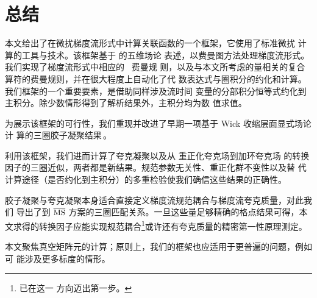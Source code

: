 \section{总结}\label{sec:conclusions}

本文给出了在微扰梯度流形式中计算关联函数的一个框架，它使用了标准微扰
 计算的工具与技术。该框架基于  的五维场论
表述，以费曼图方法处理梯度流形式。我们实现了梯度流形式中相应的 \qcd\ 费曼规
则，以及与本文所考虑的量相关的复合算符的费曼规则，并在很大程度上自动化了代
数表达式与圈积分的约化和计算。我们框架的一个重要要素，是借助同样涉及流时间
变量的分部积分恒等式约化到主积分。除少数情形得到了解析结果外，主积分均为数
值求值。

为展示该框架的可行性，我们重现并改进了早期一项基于 Wick 收缩层面显式场论计
算的三圈胶子凝聚结果\,\cite{Harlander:2016vzb}。

利用该框架，我们进而计算了夸克凝聚以及从 \msbar{} 重正化夸克场到加环夸克场
的转换因子的三圈近似，两者都是新结果。规范参数无关性、重正化群不变性以及替
代计算途径（是否约化到主积分）的多重检验使我们确信这些结果的正确性。

胶子凝聚与夸克凝聚本身适合直接定义梯度流规范耦合与梯度流夸克质量，对此我们
导出了到 $\overline{\mbox{{\small MS}}}$ 方案的三圈匹配关系。一旦这些量足够精确的格点结果可得，本
文求得的转换因子应能实现规范耦合\footnote{ 已在这一
  方向迈出第一步。}或许还有夸克质量的精密第一性原理测定。

本文聚焦真空矩阵元的计算；原则上，我们的框架也应适用于更普遍的问题，例如可
能涉及更多标度的情形。
